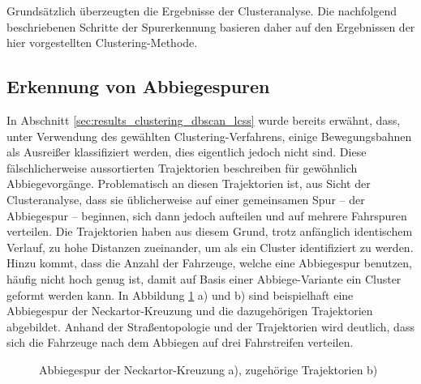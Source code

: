 Grundsätzlich überzeugten die Ergebnisse der Clusteranalyse. Die nachfolgend beschriebenen Schritte
der Spurerkennung basieren daher auf den Ergebnissen der hier vorgestellten Clustering-Methode.

\subsection{Erkennung von Abbiegespuren}
\label{sec:real_detect_turning_lane}

In Abschnitt \ref{sec:results_clustering_dbscan_lcss} wurde bereits erwähnt, dass, unter Verwendung des
gewählten Clustering-Verfahrens, einige Bewegungsbahnen als Ausreißer klassifiziert werden, dies eigentlich jedoch
nicht sind. Diese fälschlicherweise aussortierten Trajektorien beschreiben für gewöhnlich Abbiegevorgänge.
Problematisch an diesen Trajektorien ist, aus Sicht der Clusteranalyse, dass sie üblicherweise auf einer
gemeinsamen Spur -- der Abbiegespur -- beginnen, sich dann jedoch aufteilen und auf mehrere Fahrspuren verteilen.
Die Trajektorien haben aus diesem Grund, trotz anfänglich identischem Verlauf, zu hohe Distanzen zueinander, um
als ein Cluster identifiziert zu werden. Hinzu kommt, dass die Anzahl der Fahrzeuge, welche eine Abbiegespur
benutzen, häufig nicht hoch genug ist, damit auf Basis einer Abbiege-Variante ein Cluster geformt werden kann.
In Abbildung \ref{fig:real_turning_lane} a) und b) sind beispielhaft eine Abbiegespur der Neckartor-Kreuzung und
die dazugehörigen Trajektorien abgebildet. Anhand der Straßentopologie und der Trajektorien wird deutlich,
dass sich die Fahrzeuge nach dem Abbiegen auf drei Fahrstreifen verteilen.

\begin{figure}[H]
    \centering
    \qquad \qquad \qquad
    \caption[Abbiegespur Neckartor Kreuzung]{Abbiegespur der Neckartor-Kreuzung a), zugehörige Trajektorien b)}
    \label{fig:real_turning_lane}
\end{figure}

